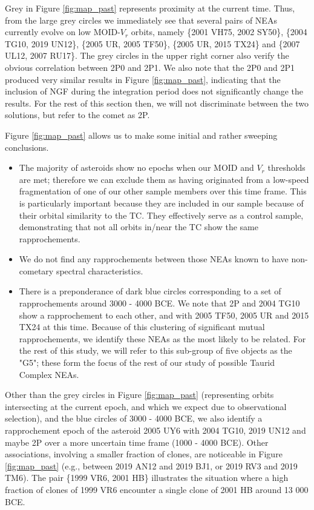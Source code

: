 \documentclass[letters,a4paper,fleqn,usenatbib]{mnras}
\begin{document}
Grey in Figure \ref{fig:map_past} represents proximity at the current time. Thus, from the large grey circles we immediately see that several pairs of NEAs currently evolve on low MOID-$V_r$ orbits, namely \{2001 VH75, 2002 SY50\}, \{2004 TG10, 2019 UN12\}, \{2005 UR, 2005 TF50\}, \{2005 UR, 2015 TX24\} and \{2007 UL12, 2007 RU17\}. The grey circles in the upper right corner also verify the obvious correlation between 2P0 and 2P1. We also note that the 2P0 and 2P1 produced very similar results in Figure \ref{fig:map_past}, indicating that the inclusion of NGF during the integration period  does not significantly change the results. For the rest of this section then, we will not discriminate between the two solutions, but refer to the comet as 2P. 

Figure \ref{fig:map_past}
allows us to make some initial and rather sweeping conclusions. 
\begin{itemize}
    \item 
 The majority of asteroids show no epochs when our MOID and $V_r$ thresholds are met; therefore we can exclude them as having originated from a low-speed fragmentation of one of our other sample members over this time frame. This is particularly important because they are included in our sample because of their orbital similarity to the TC. They effectively serve as a control sample, demonstrating that not all orbits in/near the TC show the same rapprochements.
 \item We do not find any rapprochements between those NEAs known to have non-cometary spectral characteristics. 
 \item There is a preponderance of dark blue circles corresponding to a set of  rapprochements around 3000 - 4000 BCE. We note that 2P and 2004 TG10 show a rapprochement to each other, and with 2005 TF50, 2005 UR and 2015 TX24 at this time. Because of this clustering of significant mutual rapprochements, we identify these NEAs as the most likely to be related. For the rest of this study, we will refer to this sub-group of five objects as the "G5"; these form the focus of the rest of our study of possible Taurid Complex NEAs.  
\end{itemize}

Other than the grey circles in Figure \ref{fig:map_past} (representing orbits intersecting at the current epoch, and which we expect due to observational selection), and the blue circles of 3000 - 4000 BCE, we also identify a rapprochement epoch of the asteroid 2005 UY6 with 2004 TG10, 2019 UN12 and maybe 2P over a more uncertain time frame (1000 - 4000 BCE). Other associations, involving a smaller fraction of clones, are noticeable in Figure \ref{fig:map_past} (e.g., between 2019 AN12 and 2019 BJ1, or 2019 RV3 and 2019 TM6). The pair \{1999 VR6, 2001 HB\} illustrates the situation where  a high fraction of clones of 1999 VR6 encounter a single clone of 2001 HB around 13 000 BCE.
\end{document}
